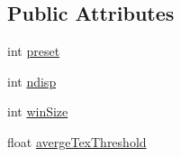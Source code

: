 \subsection*{Public Attributes}
\begin{DoxyCompactItemize}
\item 
int \hyperlink{classcv_1_1ocl_1_1StereoBM__OCL_acef365d858035ce0a04717c7d2702a53}{preset}
\item 
int \hyperlink{classcv_1_1ocl_1_1StereoBM__OCL_a29da1385aca0fdac39969f7dee0d66b1}{ndisp}
\item 
int \hyperlink{classcv_1_1ocl_1_1StereoBM__OCL_a3041e91028d459e913db11557cff9800}{win\-Size}
\item 
float \hyperlink{classcv_1_1ocl_1_1StereoBM__OCL_ae20e72d4f59d6be0519ccd4ce3930fd9}{averge\-Tex\-Threshold}
\end{DoxyCompactItemize}


